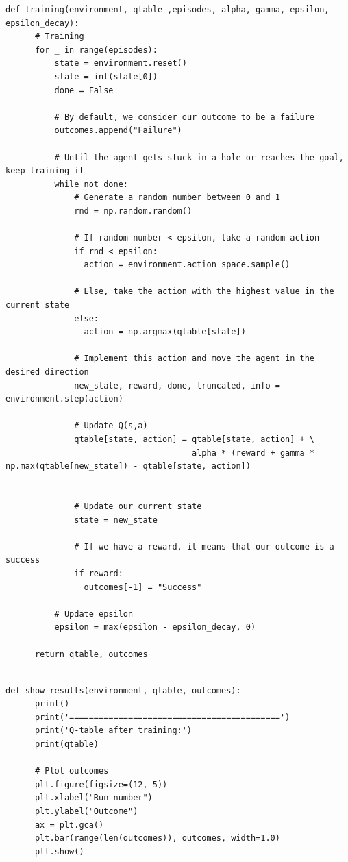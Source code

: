 \documentclass{article}
\begin{document}
\begin{lstlisting}[style=mystyle]
    def training(environment, qtable ,episodes, alpha, gamma, epsilon, epsilon_decay):
      # Training
      for _ in range(episodes):
          state = environment.reset()
          state = int(state[0])
          done = False
    
          # By default, we consider our outcome to be a failure
          outcomes.append("Failure")
          
          # Until the agent gets stuck in a hole or reaches the goal, keep training it
          while not done:
              # Generate a random number between 0 and 1
              rnd = np.random.random()
    
              # If random number < epsilon, take a random action
              if rnd < epsilon:
                action = environment.action_space.sample()
    
              # Else, take the action with the highest value in the current state
              else:
                action = np.argmax(qtable[state])
            
              # Implement this action and move the agent in the desired direction
              new_state, reward, done, truncated, info = environment.step(action)
    
              # Update Q(s,a)
              qtable[state, action] = qtable[state, action] + \
                                      alpha * (reward + gamma * np.max(qtable[new_state]) - qtable[state, action])
    
            
              # Update our current state
              state = new_state
    
              # If we have a reward, it means that our outcome is a success
              if reward:
                outcomes[-1] = "Success"
    
          # Update epsilon
          epsilon = max(epsilon - epsilon_decay, 0)
      
      return qtable, outcomes
    
\end{lstlisting}

\vspace{0.5cm}

\begin{lstlisting}[style=mystyle]
    def show_results(environment, qtable, outcomes):
      print()
      print('===========================================')
      print('Q-table after training:')
      print(qtable)
    
      # Plot outcomes
      plt.figure(figsize=(12, 5))
      plt.xlabel("Run number")
      plt.ylabel("Outcome")
      ax = plt.gca()
      plt.bar(range(len(outcomes)), outcomes, width=1.0)
      plt.show()
\end{lstlisting}
\end{document}
